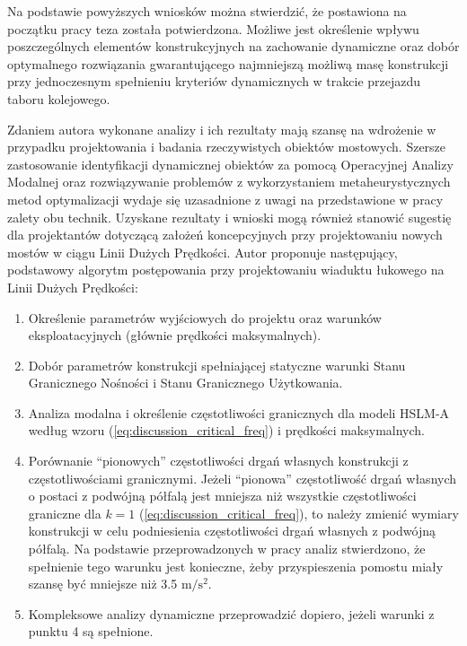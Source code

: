 Na podstawie powyższych wniosków można stwierdzić, że postawiona na początku pracy teza została potwierdzona. Możliwe jest określenie wpływu poszczególnych elementów konstrukcyjnych na zachowanie dynamiczne oraz dobór optymalnego rozwiązania gwarantującego najmniejszą możliwą masę konstrukcji przy jednoczesnym spełnieniu kryteriów dynamicznych w trakcie przejazdu taboru kolejowego.

Zdaniem autora wykonane analizy i ich rezultaty mają szansę na wdrożenie w przypadku projektowania i badania rzeczywistych obiektów mostowych. Szersze zastosowanie identyfikacji dynamicznej obiektów za pomocą Operacyjnej Analizy Modalnej oraz rozwiązywanie problemów z wykorzystaniem metaheurystycznych metod optymalizacji wydaje się uzasadnione z uwagi na przedstawione w pracy zalety obu technik. Uzyskane rezultaty i wnioski mogą również stanowić sugestię dla projektantów dotyczącą założeń koncepcyjnych przy projektowaniu nowych mostów w ciągu Linii Dużych Prędkości. Autor proponuje następujący, podstawowy algorytm postępowania przy projektowaniu wiaduktu łukowego na Linii Dużych Prędkości:
\begin{enumerate}

\item Określenie parametrów wyjściowych do projektu oraz warunków eksploatacyjnych (głównie prędkości maksymalnych).

\item Dobór parametrów konstrukcji spełniającej statyczne warunki Stanu Granicznego Nośności i Stanu Granicznego Użytkowania.

\item Analiza modalna i określenie częstotliwości granicznych dla modeli HSLM-A według wzoru (\ref{eq:discussion_critical_freq}) i prędkości maksymalnych.

\item Porównanie \enquote{pionowych} częstotliwości drgań własnych konstrukcji z częstotliwościami granicznymi. Jeżeli \enquote{pionowa} częstotliwość drgań własnych o postaci z podwójną półfalą jest mniejsza niż wszystkie częstotliwości graniczne dla $k=1$ (\ref{eq:discussion_critical_freq}), to należy zmienić wymiary konstrukcji w celu podniesienia częstotliwości drgań własnych z podwójną półfalą. Na podstawie przeprowadzonych w pracy analiz stwierdzono, że spełnienie tego warunku jest konieczne, żeby przyspieszenia pomostu miały szansę być mniejsze niż 3.5 $\mathrm{m/s^2}$.

\item Kompleksowe analizy dynamiczne przeprowadzić dopiero, jeżeli warunki z punktu 4 są spełnione.

\end{enumerate}

